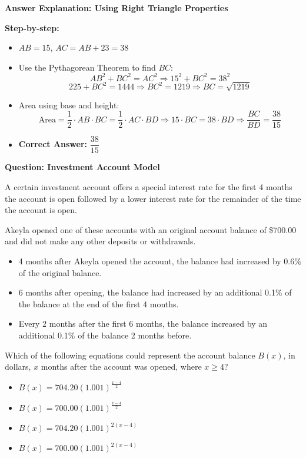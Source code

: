 \documentclass{beamer}
\begin{document}
\begin{frame}{\textbf{Answer Explanation: Using Right Triangle Properties}}
\small

\textbf{Step-by-step:}

\begin{itemize}
    \item \( AB = 15 \), \( AC = AB + 23 = 38 \)
    \item Use the Pythagorean Theorem to find \( BC \):
    \[
    AB^2 + BC^2 = AC^2 \Rightarrow 15^2 + BC^2 = 38^2
    \]
    \[
    225 + BC^2 = 1444 \Rightarrow BC^2 = 1219 \Rightarrow BC = \sqrt{1219}
    \]
    \item Area using base and height:
    \[
    \text{Area} = \frac{1}{2} \cdot AB \cdot BC = \frac{1}{2} \cdot AC \cdot BD
    \Rightarrow 15 \cdot BC = 38 \cdot BD
    \Rightarrow \frac{BC}{BD} = \frac{38}{15}
    \]

    \item \textbf{Correct Answer:} \( \boxed{\dfrac{38}{15}} \)
\end{itemize}

\end{frame}


\begin{frame}{\textbf{Question: Investment Account Model}}
\footnotesize

A certain investment account offers a special interest rate for the first 4 months the account is open followed by a lower interest rate for the remainder of the time the account is open.  

Akeyla opened one of these accounts with an original account balance of \$700.00 and did not make any other deposits or withdrawals.  
\begin{itemize}
    \item 4 months after Akeyla opened the account, the balance had increased by 0.6\% of the original balance.  
    \item 6 months after opening, the balance had increased by an additional 0.1\% of the balance at the end of the first 4 months.  
    \item Every 2 months after the first 6 months, the balance increased by an additional 0.1\% of the balance 2 months before.
\end{itemize}

Which of the following equations could represent the account balance \( B(x) \), in dollars, \( x \) months after the account was opened, where \( x \geq 4 \)?

\begin{itemize}
    \item[A.] \( B(x) = 704.20(1.001)^{\frac{x-4}{2}} \)
    \item[B.] \( B(x) = 700.00(1.001)^{\frac{x-4}{2}} \)
    \item[C.] \( B(x) = 704.20(1.001)^{2(x-4)} \)
    \item[D.] \( B(x) = 700.00(1.001)^{2(x-4)} \)
\end{itemize}

\end{frame}
\end{document}
